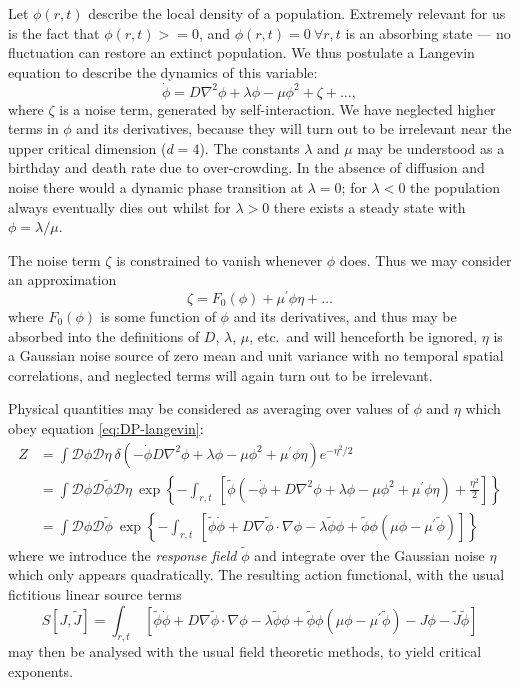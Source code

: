 \documentclass[10pt,english]{report}
\begin{document}
Let $\phi(r,t)$ describe the local density of a population. Extremely relevant for us is the fact that $\phi(r,t) >= 0$, and $\phi(r,t)=0~\forall r,t$ is an absorbing state --- no fluctuation can restore an extinct population. We thus postulate a Langevin equation to describe the dynamics of this variable: 
\begin{equation}
\dot{\phi} = D \nabla^2 \phi + \lambda \phi - \mu \phi^2 + \zeta + \ldots, \label{eq:DP-langevin}
\end{equation}
where $\zeta$ is a noise term, generated by self-interaction. We have neglected higher terms in $\phi$ and its derivatives, because they will turn out to be irrelevant near the upper critical dimension ($d=4$). The constants $\lambda$ and $\mu$ may be understood as a birthday and death rate due to over-crowding. In the absence of diffusion and noise there would a dynamic phase transition at $\lambda=0$; for $\lambda < 0$ the population always eventually dies out whilst for $\lambda > 0$ there exists a steady state with $\phi = \lambda/\mu$.

\newcommand{\tphi}{\ensuremath{\tilde \phi}}
\newcommand{\tJ}{\ensuremath{\tilde J}}

The noise term $\zeta$ is constrained to vanish whenever $\phi$ does. Thus we may consider an approximation $$\zeta = F_0(\phi) + \mu^\prime \phi \eta + \ldots$$ where $F_0(\phi)$ is some function of $\phi$ and its derivatives, and thus may be absorbed into the definitions of $D$, $\lambda$, $\mu$, etc.\ and will henceforth be ignored, $\eta$ is a Gaussian noise source of zero mean and unit variance with no temporal spatial correlations, and neglected terms will again turn out to be irrelevant. 

Physical quantities may be considered as averaging over values of $\phi$ and $\eta$ which obey equation \eqref{eq:DP-langevin}:
\begin{align*}
Z &= \int \mathcal{D}\phi \mathcal{D}\eta~\delta\left(-\dot \phi D \nabla^2 \phi + \lambda \phi - \mu \phi^2 + \mu^\prime \phi \eta \right) e^{-\eta^2/2} \\
&= \int \mathcal{D}\phi \mathcal{D}\tphi \mathcal{D}\eta~\exp\left\{-\int_{r,t}~\left[\tphi \left(-\dot \phi + D \nabla^2 \phi + \lambda \phi - \mu \phi^2 + \mu^\prime \phi \eta \right) + \frac{\eta^2}{2} \right] \right\} \\
&= \int \mathcal{D}\phi \mathcal{D}\tphi~\exp\left\{-\int_{r,t}~\left[\tphi\dot{\phi} + D \nabla \tphi \cdot \nabla \phi - \lambda\tphi\phi + \tphi\phi\left(\mu\phi - \mu^\prime\tphi \right) \right] \right\} 
\end{align*}
where we introduce the \emph{response field} $\tphi$ and integrate over the Gaussian noise $\eta$ which only appears quadratically. The resulting action functional, with the usual fictitious linear source terms
\begin{equation}
S[J,\tJ] = \int_{r,t}~\left[\tphi\dot{\phi} + D \nabla \tphi \cdot \nabla \phi - \lambda\tphi\phi + \tphi\phi\left(\mu\phi - \mu^\prime\tphi \right) - J\phi - \tJ\tphi \right]
\end{equation}
may then be analysed with the usual field theoretic methods, to yield critical exponents.
 
\end{document}
